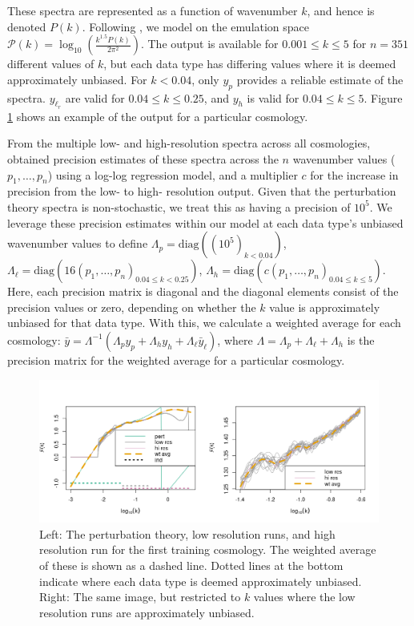 \documentclass[11pt]{article}
\begin{document}
These spectra are represented as a function of wavenumber $k$, and hence is denoted $P(k)$. Following \cite{moran2023mira}, we model on the emulation space $\mathcal{P}(k)=\log_{10}\left(\frac{k^{1.5}P(k)}{2\pi^2}\right)$. The output is available for $0.001 \leq k \leq 5$ for $n=351$ different values of $k$, but each data type has differing values where it is deemed approximately unbiased. For $k<0.04$, only $y_p$ provides a reliable estimate of the spectra. $y_{\ell_r}$ are valid for $0.04 \leq k \leq 0.25$, and $y_h$ is valid for $0.04 \leq k \leq 5$. Figure \ref{fig:plot_data} shows an example of the output for a particular cosmology.

From the multiple low- and high-resolution spectra across all cosmologies, \cite{moran2023mira} obtained precision estimates of these spectra across the $n$ wavenumber values ($p_1,\dots,p_n$) using a log-log regression model, and a multiplier $c$ for the increase in precision from the low- to high- resolution output. Given that the perturbation theory spectra is non-stochastic, we treat this as having a precision of $10^5$. We leverage these precision estimates within our model at each data type's unbiased wavenumber values to define $\Lambda_p = \text{diag}\left((10^5)_{k < 0.04}\right)$, $\Lambda_{\ell} = \text{diag}\left(16(p_1,\dots,p_n)_{0.04 \leq k < 0.25}\right)$, $\Lambda_h = \text{diag}\left(c(p_1,\dots,p_n)_{0.04 \leq k \leq 5}\right)$. Here, each precision matrix is diagonal and the diagonal elements consist of the precision values or zero, depending on whether the $k$ value is approximately unbiased for that data type. With this, we calculate a weighted average for each cosmology: $\bar y = \Lambda^{-1}(\Lambda_p y_p + \Lambda_h y_h + \Lambda_{\ell} \bar{y}_\ell)$, where $\Lambda = \Lambda_p + \Lambda_\ell + \Lambda_h$ is the precision matrix for the weighted average for a particular cosmology.

\begin{figure}[ht]
    \centering
    \includegraphics[width=6in]{plot_data.png}
    \caption{Left: The perturbation theory, low resolution runs, and high resolution run for the first training cosmology. The weighted average of these is shown as a dashed line. Dotted lines at the bottom indicate where each data type is deemed approximately unbiased. Right: The same image, but restricted to $k$ values where the low resolution runs are approximately unbiased.}
    \label{fig:plot_data}
\end{figure}
\end{document}
